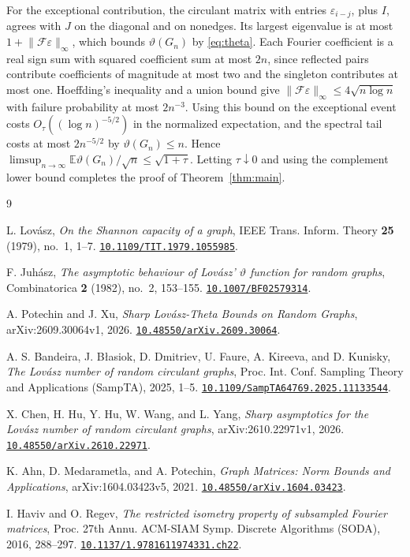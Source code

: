 \documentclass[preprints,article,submit,oneauthor]{Definitions/mdpi}
\newcommand{\E}{\mathbb E}
\newcommand{\norm}[1]{\lVert #1\rVert}
\newcommand{\doi}[1]{\href{https://doi.org/#1}{\nolinkurl{#1}}}
\begin{document}
For the exceptional contribution, the circulant matrix with entries
\(\varepsilon_{i-j}\), plus \(I\), agrees with \(J\) on the diagonal
and on nonedges. Its largest eigenvalue is at most
\(1+\norm{\mathcal F\varepsilon}_\infty\), which bounds
\(\vartheta(G_n)\) by \eqref{eq:theta}. Each Fourier coefficient is a
real sign sum with squared coefficient sum at most \(2n\), since
reflected pairs contribute coefficients of magnitude at most two
and the singleton contributes at most one. Hoeffding's inequality and a union
bound give \(\norm{\mathcal F\varepsilon}_\infty\le4\sqrt{n\log n}\)
with failure probability at most \(2n^{-3}\). Using this bound on the
exceptional event costs \(O_\tau((\log n)^{-5/2})\) in the normalized
expectation, and the spectral tail costs at most \(2n^{-5/2}\) by
\(\vartheta(G_n)\le n\). Hence
\(\limsup_{n\to\infty}\E\vartheta(G_n)/\sqrt n\le\sqrt{1+\tau}\).
Letting \(\tau\downarrow0\) and using the complement lower bound
completes the proof of Theorem~\ref{thm:main}.


\begin{thebibliography}{9}

L. Lov\'asz, \emph{On the Shannon capacity of a graph},
IEEE Trans. Inform. Theory \textbf{25} (1979), no.~1, 1--7.
\doi{10.1109/TIT.1979.1055985}.

F. Juh\'asz, \emph{The asymptotic behaviour of Lov\'asz' \(\vartheta\)
function for random graphs}, Combinatorica \textbf{2} (1982), no.~2,
153--155.
\doi{10.1007/BF02579314}.

A. Potechin and J. Xu, \emph{Sharp Lov\'asz-Theta Bounds on Random Graphs},
arXiv:2609.30064v1, 2026. \doi{10.48550/arXiv.2609.30064}.

A. S. Bandeira, J. B{\l}asiok, D. Dmitriev, U. Faure, A. Kireeva,
and D. Kunisky, \emph{The Lov\'asz number of random circulant graphs},
Proc. Int. Conf. Sampling Theory and Applications (SampTA), 2025,
1--5.
\doi{10.1109/SampTA64769.2025.11133544}.

X. Chen, H. Hu, Y. Hu, W. Wang, and L. Yang, \emph{Sharp asymptotics for
the Lov\'asz number of random circulant graphs}, arXiv:2610.22971v1, 2026.
\doi{10.48550/arXiv.2610.22971}.

K. Ahn, D. Medarametla, and A. Potechin, \emph{Graph Matrices: Norm
Bounds and Applications}, arXiv:1604.03423v5, 2021.
\doi{10.48550/arXiv.1604.03423}.

I. Haviv and O. Regev, \emph{The restricted isometry property of
subsampled Fourier matrices}, Proc. 27th Annu. ACM-SIAM Symp.
Discrete Algorithms (SODA), 2016, 288--297.
\doi{10.1137/1.9781611974331.ch22}.

\end{thebibliography}
\end{document}
